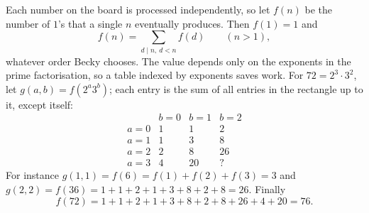 Each number on the board is processed independently, so let $f(n)$ be the number of $1$'s that a single $n$ eventually produces. Then $f(1)=1$ and
\[
f(n)=\sum_{d\mid n,\ d<n}f(d)\qquad(n>1),
\]
whatever order Becky chooses. The value depends only on the exponents in the prime factorisation, so a table indexed by exponents saves work. For $72=2^3\cdot3^2$, let $g(a,b)=f(2^a3^b)$; each entry is the sum of all entries in the rectangle up to it, except itself:
\[
\begin{array}{c|ccc}
 & b=0 & b=1 & b=2\\ \hline
a=0 & 1 & 1 & 2\\
a=1 & 1 & 3 & 8\\
a=2 & 2 & 8 & 26\\
a=3 & 4 & 20 & ?
\end{array}
\]
For instance $g(1,1)=f(6)=f(1)+f(2)+f(3)=3$ and $g(2,2)=f(36)=1+1+2+1+3+8+2+8=26$. Finally
\[
f(72)=1+1+2+1+3+8+2+8+26+4+20=\boxed{76}.
\]

